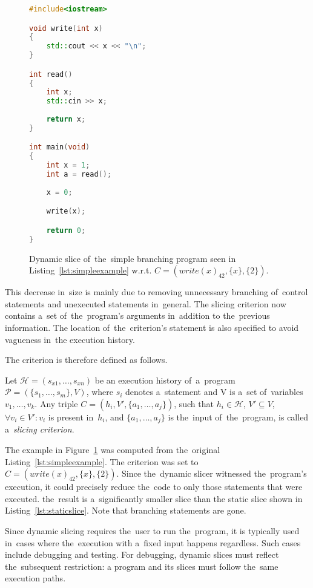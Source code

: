 \begin{figure}[ht]\centering
\begin{lstlisting}[language=C++]
#include<iostream>

void write(int x)
{
	std::cout << x << "\n";
}

int read()
{
	int x;
	std::cin >> x;
	
	return x;
}

int main(void)
{
	int x = 1;
	int a = read();
		
	x = 0;

	write(x);

	return 0;
}  
\end{lstlisting}
\caption{Dynamic slice of~the~simple branching program seen
in Listing~\ref{lst:simpleexample} w.r.t. 
$C = (write(x)_{42}, \{x\}, \{2\})$.}
\label{lst:dynamicslice}
\end{figure}

This decrease in~size is mainly due to removing unnecessary 
branching of~control statements and unexecuted statements in~general. 
The slicing criterion now contains a~set of~the~program's 
arguments in~addition to the~previous information. 
The location of~the~criterion's statement is also specified to avoid 
vagueness in~the execution history. 

The criterion is therefore defined as follows.

\begin{defn}\label{def02:6}
  Let $\mathcal{H} = (s_{x1},\dots,s_{xn})$ be an execution history of~a~program 
  $\mathcal{P} = (\{s_1,\dots,s_m\}, V)$, where $s_i$ denotes a~statement
  and V is a~set of~variables $v_1,\dots,v_k$.
  Any triple $C = (h_i, V', \{a_1,\dots,a_j\})$, such that $h_i \in \mathcal{H}$,
  $V' \subseteq V$, $\forall v_i \in V': v_i$ is present in~$h_i$,
  and $\{a_1,\dots,a_j\}$ is the~input of~the~program,
  is called a~\emph{slicing criterion}.
\end{defn}

The example in Figure~\ref{lst:dynamicslice} was computed from the~original
Listing~\ref{lst:simpleexample}. 
The criterion was set to $C = (write(x)_{42}, \{x\}, \{2\})$.
Since the~dynamic slicer witnessed the~program's execution,
it could precisely reduce the~code to only those statements
that were executed. the~result is a~significantly smaller slice
than the static slice shown in Listing~\ref{lst:staticslice}.
Note that branching statements are gone.

Since dynamic slicing requires the~user to run the~program, 
it is typically used in~cases where the~execution with a~fixed 
input happens regardless. Such cases include debugging and testing. 
For debugging, dynamic slices must reflect the~subsequent restriction: 
a program and its slices must follow the~same execution paths.

